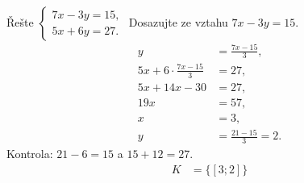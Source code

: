 \documentclass[11pt,a4paper]{article}
\begin{document}
\begin{prikladReseniBox}[title={Příklad 3}]
Řešte $\begin{cases}7x-3y=15,\\5x+6y=27.\end{cases}$ Dosazujte ze vztahu $7x-3y=15$.
\tcblower
\[
\begin{aligned}
y&=\frac{7x-15}{3},\\
5x+6\cdot\frac{7x-15}{3}&=27,\\
5x+14x-30&=27,\\
19x&=57,\\
x&=3,\\
y&=\frac{21-15}{3}=2.
\end{aligned}
\]
Kontrola: $21-6=15$ a $15+12=27$.
\[
\begin{aligned}
K &= \{[3;2]\}
\end{aligned}
\]
\end{prikladReseniBox}
\end{document}
